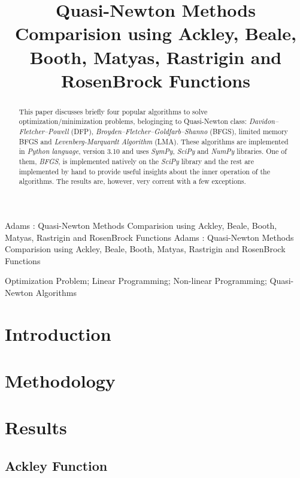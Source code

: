 \documentclass[conference]{IEEEtran}
\begin{document}
\title{Quasi-Newton Methods Comparision using Ackley, Beale, Booth, Matyas, Rastrigin and RosenBrock Functions}
\author{
	 
}

\markboth
{Adams \headeretal: Quasi-Newton Methods Comparision using Ackley, Beale, Booth, Matyas, Rastrigin and RosenBrock Functions}
{Adams \headeretal: Quasi-Newton Methods Comparision using Ackley, Beale, Booth, Matyas, Rastrigin and RosenBrock Functions}


\maketitle

\begin{abstract}
This paper discusses briefly four popular algorithms to solve optimization/minimization problems, beloginging to Quasi-Newton class: \textit{Davidon–Fletcher–Powell} (DFP), \textit{Broyden–Fletcher–Goldfarb–Shanno} (BFGS), limited memory BFGS and \textit{Levenberg-Marquardt Algorithm} (LMA). These algorithms are implemented in \textit{Python language}, version 3.10 and uses \textit{SymPy}, \textit{SciPy} and \textit{NumPy} libraries. One of them, \textit{BFGS}, is implemented natively on the  \textit{SciPy} library and the rest are implemented by hand to provide useful insights about the inner operation of the algorithms. The results are, however, very corrent with a few exceptions.
\end{abstract}


\begin{IEEEkeywords}Optimization Problem; Linear Programming; Non-linear Programming; Quasi-Newton Algorithms\end{IEEEkeywords}

\section{Introduction}

\section{Methodology}

\section{Results}

\subsection{Ackley Function}




\end{document}
